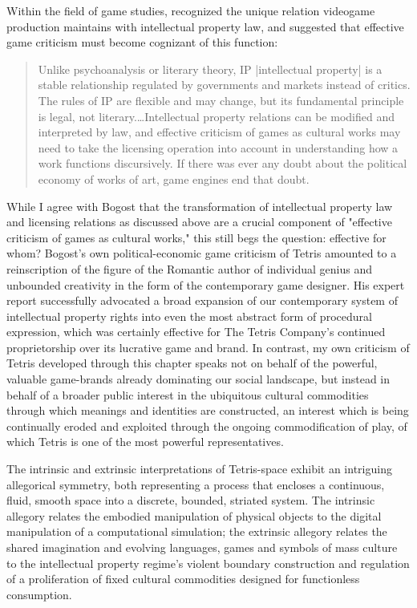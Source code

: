 Within the field of game studies, \citeauthor{Bogost2012-wr} recognized the unique relation videogame production maintains with intellectual property law, and suggested that effective game criticism must become cognizant of this function:
\blockquote{
  Unlike psychoanalysis or literary theory, IP |intellectual property| is a stable relationship regulated by governments and markets instead of critics. The rules of IP are flexible and may change, but its fundamental principle is legal, not literary.…Intellectual property relations can be modified and interpreted by law, and effective criticism of games as cultural works may need to take the licensing operation into account in understanding how a work functions discursively. If there was ever any doubt about the political economy of works of art, game engines end that doubt. \autocite*[61-2]{Bogost2006-ec}
}
While I agree with Bogost that the transformation of intellectual property law and licensing relations as discussed above are a crucial component of "effective criticism of games as cultural works," this still begs the question: effective for whom? Bogost's own political-economic game criticism of Tetris amounted to a reinscription of the figure of the Romantic author of individual genius and unbounded creativity in the form of the contemporary game designer. His expert report successfully advocated a broad expansion of our contemporary system of intellectual property rights into even the most abstract form of procedural expression, which was certainly effective for The Tetris Company's continued proprietorship over its lucrative game and brand. In contrast, my own criticism of Tetris developed through this chapter speaks not on behalf of the powerful, valuable game-brands already dominating our social landscape, but instead in behalf of a broader public interest in the ubiquitous cultural commodities through which meanings and identities are constructed, an interest which is being continually eroded and exploited through the ongoing commodification of play, of which Tetris is one of the most powerful representatives.

The intrinsic and extrinsic interpretations of Tetris-space exhibit an intriguing allegorical symmetry, both representing a process that encloses a continuous, fluid, smooth space into a discrete, bounded, striated system. The intrinsic allegory relates the embodied manipulation of physical objects to the digital manipulation of a computational simulation; the extrinsic allegory relates the shared imagination and evolving languages, games and symbols of mass culture to the intellectual property regime's violent boundary construction and regulation of a proliferation of fixed cultural commodities designed for functionless consumption.

